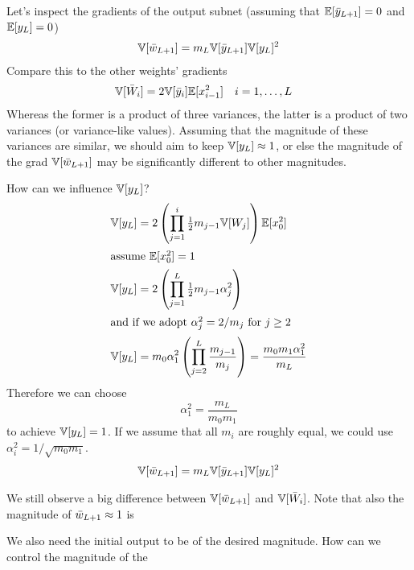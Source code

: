 Let's inspect the gradients of the output subnet (assuming that $\mathbb{E}[\bar{y}_{L+1}] = 0$ and $\mathbb{E}[y_{L}] = 0$)
\begin{align}
\mathbb{V}[\bar{w}_{L+1}] = m_{L} \mathbb{V}[\bar{y}_{L+1}] \mathbb{V}[y_{L}]^{2}
\end{align}
Compare this to the other weights' gradients
\begin{align}
\mathbb{V}[\bar{W}_{i}] & = 2 \mathbb{V}[\bar{y}_{i}] \mathbb{E}[x_{i - 1}^2] && i = 1, \dots, L
\end{align}
Whereas the former is a product of three variances, the latter is a product of two variances (or variance-like values).
Assuming that the magnitude of these variances are similar, we should aim to keep $\mathbb{V}[y_{L}] \approx 1$, or else the magnitude of the grad $\mathbb{V}[\bar{w}_{L+1}]$ may be significantly different to other magnitudes.

How can we influence $\mathbb{V}[y_{L}]$?
\begin{align}
\mathbb{V}[y_{L}] & = 2 \left(\prod_{j = 1}^{i} \tfrac{1}{2} m_{j - 1} \mathbb{V}[W_{j}]\right) \mathbb{E}[x_{0}^2] \\
\intertext{assume $\mathbb{E}[x_{0}^2] = 1$}
\mathbb{V}[y_{L}] & = 2 \left(\prod_{j = 1}^{L} \tfrac{1}{2} m_{j - 1} \alpha_{j}^2\right) \\
\intertext{and if we adopt $\alpha_{j}^2 = 2/m_{j}$ for $j \ge 2$}
\mathbb{V}[y_{L}] & = m_{0} \alpha_{1}^2 \left(\prod_{j = 2}^{L} \frac{m_{j-1}}{m_{j}} \right)
  = \frac{m_{0} m_{1} \alpha_{1}^2}{m_{L}}
\end{align}
Therefore we can choose
\begin{equation}
\alpha_{1}^2 = \frac{m_{L}}{m_{0} m_{1}}
\end{equation}
to achieve $\mathbb{V}[y_{L}] = 1$.
If we assume that all $m_{i}$ are roughly equal, we could use $\alpha_{i}^2 = 1 / \sqrt{m_{0} m_{1}}$.
\begin{align}
\mathbb{V}[\bar{w}_{L+1}] = m_{L} \mathbb{V}[\bar{y}_{L+1}] \mathbb{V}[y_{L}]^{2}
\end{align}

We still observe a big difference between $\mathbb{V}[\bar{w}_{L+1}]$ and $\mathbb{V}[\bar{W}_{i}]$.
Note that also the magnitude of $\bar{w}_{L+1} \approx 1$ is 

We also need the initial output to be of the desired magnitude.
How can we control the magnitude of the 

\vspace{2em}

